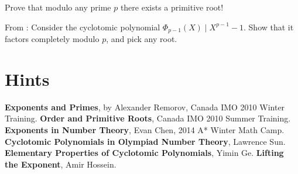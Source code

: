 \documentclass[11pt]{scrartcl}
\begin{document}
\begin{problem}
  Prove that modulo any prime $p$ there exists a primitive root!
  \begin{hint}
    From \cite{ref:lsun}:
    Consider the cyclotomic polynomial $\Phi_{p-1}(X) \mid X^{p-1}-1$.
    Show that it factors completely modulo $p$, and pick any root.
  \end{hint}
\end{problem}



\bigskip

\section{Hints}
\begin{enumerate}
  
\end{enumerate}

\begin{thebibliography}{9}
   \textbf{Exponents and Primes},
    by Alexander Remorov, Canada IMO 2010 Winter Training.
   \textbf{Order and Primitive Roots},
    Canada IMO 2010 Summer Training.
   \textbf{Exponents in Number Theory},
    Evan Chen, 2014 A* Winter Math Camp.
   \textbf{Cyclotomic Polynomials in Olympiad Number Theory},
    Lawrence Sun.
   \textbf{Elementary Properties of Cyclotomic Polynomials},
    Yimin Ge.
   \textbf{Lifting the Exponent},
    Amir Hossein.
\end{thebibliography}
\end{document}

